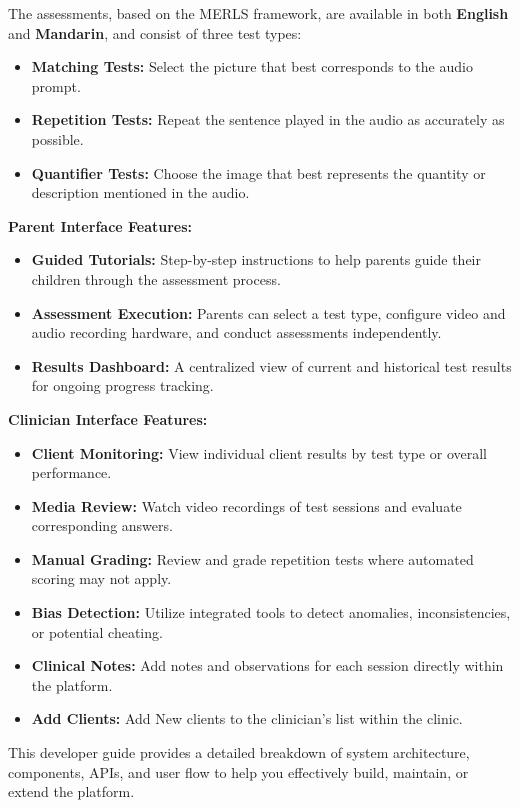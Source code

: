 \documentclass{article}
\begin{document}
The assessments, based on the MERLS framework, are available in both \textbf{English} and \textbf{Mandarin}, and consist of three test types:
\begin{itemize}
    \item \textbf{Matching Tests:} Select the picture that best corresponds to the audio prompt.
    \item \textbf{Repetition Tests:} Repeat the sentence played in the audio as accurately as possible.
    \item \textbf{Quantifier Tests:} Choose the image that best represents the quantity or description mentioned in the audio.
\end{itemize}

\noindent\textbf{Parent Interface Features:}
\begin{itemize}
    \item \textbf{Guided Tutorials:} Step-by-step instructions to help parents guide their children through the assessment process.
    \item \textbf{Assessment Execution:} Parents can select a test type, configure video and audio recording hardware, and conduct assessments independently.
    \item \textbf{Results Dashboard:} A centralized view of current and historical test results for ongoing progress tracking.
\end{itemize}

\noindent\textbf{Clinician Interface Features:}
\begin{itemize}
    \item \textbf{Client Monitoring:} View individual client results by test type or overall performance.
    \item \textbf{Media Review:} Watch video recordings of test sessions and evaluate corresponding answers.
    \item \textbf{Manual Grading:} Review and grade repetition tests where automated scoring may not apply.
    \item \textbf{Bias Detection:} Utilize integrated tools to detect anomalies, inconsistencies, or potential cheating.
    \item \textbf{Clinical Notes:} Add notes and observations for each session directly within the platform.
    \item \textbf{Add Clients:} Add New clients to the clinician's list within the clinic.
\end{itemize}

This developer guide provides a detailed breakdown of system architecture, components, APIs, and user flow to help you effectively build, maintain, or extend the platform.
\end{document}
